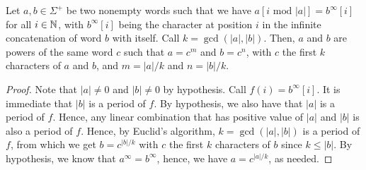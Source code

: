\begin{lemma}\label{lem:word-theory}
    Let $a,b \in \Sigma^+$ be two nonempty words such that we have $a[i \text{ mod } |a|] = b^\infty [i]$ for all $i\in\mathbb{N}$, with $b^\infty [i]$ being the character at position $i$ in the infinite concatenation of word $b$ with itself. Call $k=\operatorname{gcd}(|a|,|b|)$. Then, $a$ and $b$ are powers of the same word $c$ such that $a = c^m$ and $b = c^n$, with $c$ the first $k$ characters of $a$ and $b$, and $m = |a|/k$ and $n = |b|/k$.
\end{lemma}
\begin{proof}
    Note that $|a| \neq 0$ and $|b| \neq 0$ by hypothesis. Call $f(i) = b^\infty[i]$. It is immediate that $|b|$ is a period of $f$. By hypothesis, we also have that $|a|$ is a period of $f$. Hence, any linear combination that has positive value of $|a|$ and $|b|$ is also a period of $f$. Hence, by Euclid's algorithm, $k=\operatorname{gcd}(|a|,|b|)$ is a period of $f$, from which we get $b = c^{|b|/k}$ with $c$ the first $k$ characters of $b$ since $k \leq |b|$. By hypothesis, we know that $a^{\infty} = b^{\infty}$, hence, we have $a = c^{|a|/k}$, as needed.


\end{proof}

